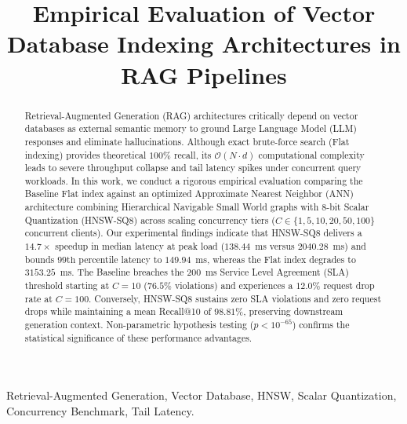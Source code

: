 \documentclass[conference]{IEEEtran}
\begin{document}
\title{Empirical Evaluation of Vector Database Indexing Architectures in RAG Pipelines}

\author{
}

\maketitle

\begin{abstract}
Retrieval-Augmented Generation (RAG) architectures critically depend on vector databases as external semantic memory to ground Large Language Model (LLM) responses and eliminate hallucinations. Although exact brute-force search (Flat indexing) provides theoretical $100\%$ recall, its $\mathcal{O}(N \cdot d)$ computational complexity leads to severe throughput collapse and tail latency spikes under concurrent query workloads. In this work, we conduct a rigorous empirical evaluation comparing the Baseline Flat index against an optimized Approximate Nearest Neighbor (ANN) architecture combining Hierarchical Navigable Small World graphs with 8-bit Scalar Quantization (HNSW-SQ8) across scaling concurrency tiers ($C \in \{1, 5, 10, 20, 50, 100\}$ concurrent clients). Our experimental findings indicate that HNSW-SQ8 delivers a $14.7\times$ speedup in median latency at peak load ($138.44$~ms versus $2040.28$~ms) and bounds $99\text{th}$ percentile latency to $149.94$~ms, whereas the Flat index degrades to $3153.25$~ms. The Baseline breaches the $200$~ms Service Level Agreement (SLA) threshold starting at $C=10$ ($76.5\%$ violations) and experiences a $12.0\%$ request drop rate at $C=100$. Conversely, HNSW-SQ8 sustains zero SLA violations and zero request drops while maintaining a mean Recall@10 of $98.81\%$, preserving downstream generation context. Non-parametric hypothesis testing ($p < 10^{-65}$) confirms the statistical significance of these performance advantages.
\end{abstract}

\begin{IEEEkeywords}
Retrieval-Augmented Generation, Vector Database, HNSW, Scalar Quantization, Concurrency Benchmark, Tail Latency.
\end{IEEEkeywords}
\end{document}
